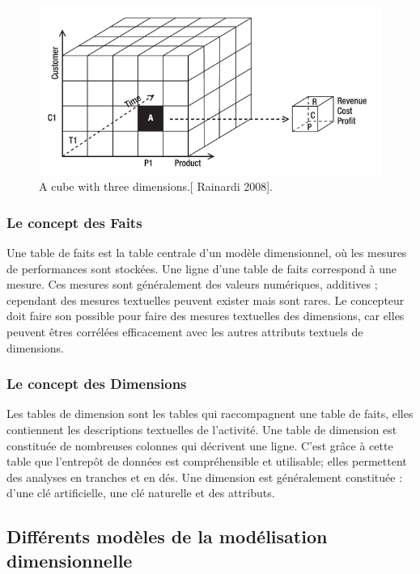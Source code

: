  \begin{figure}[h]
	\begin{center}
		\includegraphics[scale=0.85]{images/cube.png}
		\caption{A cube with three dimensions.[ Rainardi 2008].}
		\label{Cube-dimensionnel}
	\end{center}
\end{figure}
 
 
 \subsubsection{Le concept des Faits}
 	 Une table de faits est la table centrale d’un modèle dimensionnel, où les mesures de performances sont stockées. Une ligne d'une table de faits correspond à une mesure. Ces mesures sont généralement des valeurs numériques, additives ; cependant des mesures textuelles peuvent exister mais sont rares. Le concepteur doit faire son possible pour faire des mesures textuelles des dimensions, car elles peuvent êtres corrélées efficacement avec les autres attributs textuels de dimensions.
 
 \subsubsection{Le concept des Dimensions}
 
  Les tables de dimension sont les tables qui raccompagnent une table de faits, elles contiennent les descriptions textuelles de l'activité. Une table de dimension est constituée de nombreuses colonnes qui décrivent une ligne. C'est grâce à cette table que l'entrepôt de données est compréhensible et utilisable; elles permettent des analyses en tranches et en dés. Une dimension est généralement constituée : d'une clé artificielle, une clé naturelle et des attributs.
  
 \subsection{Différents modèles de la modélisation dimensionnelle}
  

